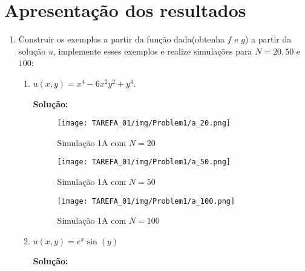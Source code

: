 \documentclass[column,amsmath,amssymb,floatfix]{revtex4}
\begin{document}
    \section{Apresentação dos resultados}
        \begin{enumerate}
            \item Construir os exemplos a partir da função dada(obtenha $f$ e $g$) a partir da solução $u$, implemente esses exemplos e realize simulações para $N = 20, 50$ e $100$:
            \begin{enumerate}
                \item $u(x,y) = x^4 - 6x^2y^2 + y^4$.

                \textbf{Solução:}

                \begin{figure}[H]
                    \centering
                    \begin{minipage}{0.32\textwidth}
                        \centering
                        \texttt{[image: TAREFA\_01/img/Problem1/a\_20.png]}
                        \caption{Simulação 1A com $N = 20$}
                    \end{minipage}
                    \hfill
                    \begin{minipage}{0.32\textwidth}
                        \centering
                        \texttt{[image: TAREFA\_01/img/Problem1/a\_50.png]}
                        \caption{Simulação 1A com $N = 50$}
                    \end{minipage}
                    \hfill
                    \begin{minipage}{0.32\textwidth}
                        \centering
                        \texttt{[image: TAREFA\_01/img/Problem1/a\_100.png]}
                        \caption{Simulação 1A com $N = 100$}
                    \end{minipage}
                \end{figure}
            
                \item $u(x,y) = e^x \sin(y)$

                \textbf{Solução:}
                

\end{enumerate}
\end{enumerate}
\end{document}
